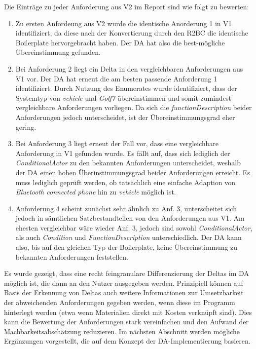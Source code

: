 \documentclass[12pt]{report}
\begin{document}
Die Einträge zu jeder Anforderung aus V2 im Report sind wie folgt zu bewerten:
\begin{enumerate}
\item Zu ersten Anfordeung aus V2 wurde die identische Anorderung 1 in V1 identifiziert, da diese nach der Konvertierung durch den R2BC die identische Boilerplate hervorgebracht haben. Der DA hat also die best-mögliche Übereinstimmung gefunden.
\item Bei Anforderung 2 liegt ein Delta in den vergleichbaren Anforderungen aus V1 vor. Der DA hat erneut die am besten passende Anforderung 1 identifiziert. Durch Nutzung des Enumerates wurde identifiziert, dass der Systemtyp von \textit{vehicle} und \textit{Golf7} übereinstimmen und somit zumindest vergleichbare Anforderungen vorliegen. Da sich die \textit{functionDescription} beider Anforderungen jedoch unterscheidet, ist der Übereinstimmungsgrad eher gering.
\item Bei Anforderung 3 liegt erneut der Fall vor, dass eine vergleichbare Anforderung in V1 gefunden wurde. Es fällt auf, dass sich lediglich der \textit{ConditionalActor} zu den bekannten Anforderungen unterscheidet, weshalb der DA einen hohen Überinstimmungsgrad beider Anforderungen erreicht. Es muss lediglich geprüft werden, ob tatsächlich eine einfache Adaption von \textit{Bluetooth connected phone} hin zu \textit{vehicle} möglich ist.
\item Anforderung 4 scheint zunächst sehr ähnlich zu Anf. 3, unterscheitet sich jedoch in sämtlichen Satzbestandteilen von den Anforderungen aus V1. Am ehesten vergleichbar wäre wieder Anf. 3, jedoch sind sowohl \textit{ConditionalActor}, als auch \textit{Condition} und \textit{FunctionDescription} unterschiedlich. Der DA kann also, bis auf den gleichen Typ der Boilerplate, keine Übereinstimmung zu bekannten Anforderungen feststellen.
\end{enumerate}

Es wurde gezeigt, dass eine recht feingranulare Differenzierung der Deltas im DA möglich ist, die dann an den Nutzer ausgegeben werden. Prinzipiell können auf Basis der Erkennung von Deltas auch weitere Informationen zur Umsetzbarkeit der abweichenden Anforderungen gegeben werden, wenn diese im Programm hinterlegt werden (etwa wenn Materialien direkt mit Kosten verknüpft sind). 
Dies kann die Bewertung der Anforderungen stark vereinfachen und den Aufwand der Machbarkeitsabschätzung reduzieren.
Im nächsten Abschnitt werden mögliche Ergänzungen vorgestellt, die auf dem Konzept der DA-Implementierung basieren. 
\end{document}
